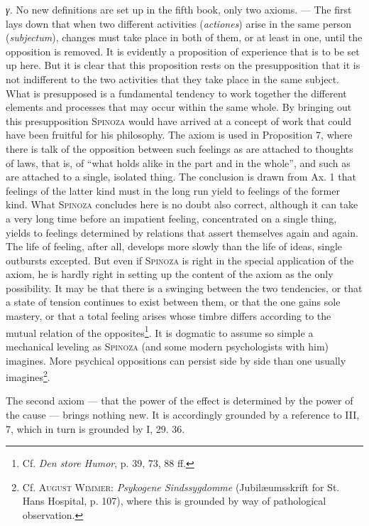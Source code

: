 \documentclass[12pt]{article}
\newcommand{\opage}[1]{\marginnote{\footnotesize\textit{[#1]}}}
\begin{document}
\textit{γ.} No new definitions are set up in the fifth book, only two axioms. --- The first lays
down that when two different activities (\textit{actiones}) arise in the same person
(\textit{subjectum}), changes must take place in both of them, or at least in one, until the
opposition is removed. It is evidently a proposition of experience that is to be set up here. But
it is clear that this proposition rests on the presupposition that it is not indifferent to the two
activities that they take place in the same subject. What is presupposed is a fundamental tendency
to work together the different elements and processes that may occur within the same whole. By
bringing out this presupposition \textsc{Spinoza} would have arrived at a concept of work that could
have been fruitful for his philosophy. The axiom is used in Proposition 7, where there is talk of
the opposition between such feelings as are attached to thoughts of laws, that is, of ``what holds
alike in the part and in the whole'', and such as are attached to a single, isolated thing. The
conclusion is drawn from Ax. 1 that feelings of the latter kind must in the long run yield to
feelings of the former kind. What \textsc{Spinoza} concludes here is no doubt also correct,
although it can take a very long time before an impatient feeling, concentrated on a single thing,
yields to feelings determined by relations that assert themselves again and again. The life of
feeling, after all, develops more slowly than the life of ideas, single outbursts excepted. But even
if \textsc{Spinoza} is right in the special application of the axiom, he is hardly right in setting
up the content of the axiom as the only possibility. It may be that there is a swinging between the
two tendencies, or that a state of tension continues to exist between them, or that the one gains
sole mastery, or that a total feeling arises whose timbre differs according to the mutual relation
of the opposites\footnote{Cf. \textit{Den store Humor}, p. 39, 73, 88 ff.}. It is dogmatic to assume
so simple a mechanical leveling as \textsc{Spinoza} (and some modern \opage{87}psychologists with
him) imagines. More psychical oppositions can persist side by side than one usually
imagines\footnote{Cf. \textsc{August Wimmer}: \textit{Psykogene Sindssygdomme} (Jubilæumsskrift for
St. Hans Hospital, p. 107), where this is grounded by way of pathological observation.}.

The second axiom --- that the power of the effect is determined by the power of the cause ---
brings nothing new. It is accordingly grounded by a reference to III, 7, which in turn is grounded by
I, 29. 36.
\end{document}
